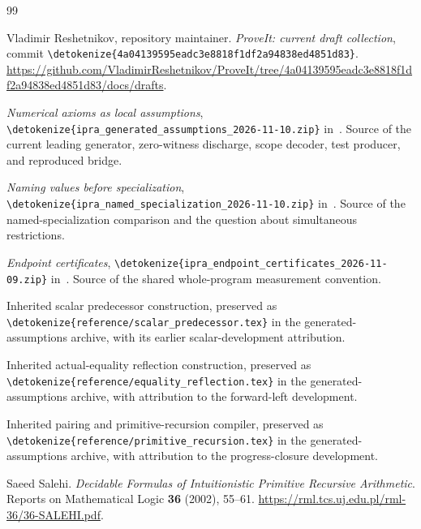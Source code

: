 \documentclass[11pt,letterpaper]{article}
\theoremstyle{definition}\newtheorem{definition}[theorem]{Definition}
\theoremstyle{remark}\newtheorem{remark}[theorem]{Remark}
\newcommand{\file}[1]{\expandafter\nolinkurl\expandafter{\detokenize{#1}}}
\begin{document}
\clearpage
\begin{thebibliography}{99}\raggedright
{}
Vladimir Reshetnikov, repository maintainer. \emph{ProveIt: current draft
collection}, commit \file{4a04139595eadc3e8818f1df2a94838ed4851d83}.
\url{https://github.com/VladimirReshetnikov/ProveIt/tree/4a04139595eadc3e8818f1df2a94838ed4851d83/docs/drafts}.

\emph{Numerical axioms as local assumptions},
\file{ipra_generated_assumptions_2026-11-10.zip} in~\cite{snapshot}.
Source of the current leading generator, zero-witness discharge,
scope decoder, test producer, and reproduced bridge.

\emph{Naming values before specialization},
\file{ipra_named_specialization_2026-11-10.zip} in~\cite{snapshot}.
Source of the named-specialization comparison and the question about
simultaneous restrictions.

\emph{Endpoint certificates},
\file{ipra_endpoint_certificates_2026-11-09.zip} in~\cite{snapshot}.
Source of the shared whole-program measurement convention.

Inherited scalar predecessor construction, preserved as
\file{reference/scalar_predecessor.tex} in the generated-assumptions
archive, with its earlier scalar-development attribution.

Inherited actual-equality reflection construction, preserved as
\file{reference/equality_reflection.tex} in the generated-assumptions
archive, with attribution to the forward-left development.

Inherited pairing and primitive-recursion compiler, preserved as
\file{reference/primitive_recursion.tex} in the generated-assumptions
archive, with attribution to the progress-closure development.

Saeed Salehi. \emph{Decidable Formulas of Intuitionistic Primitive
Recursive Arithmetic}. Reports on Mathematical Logic \textbf{36}
(2002), 55--61.
\url{https://rml.tcs.uj.edu.pl/rml-36/36-SALEHI.pdf}.
\end{thebibliography}
\end{document}
